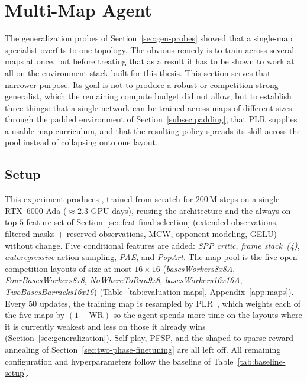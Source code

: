 \section{Multi-Map Agent}
\label{sec:multi-map}

The generalization probes of Section~\ref{sec:gen-probes} showed that a single-map specialist overfits to one topology. The obvious remedy is to train across several maps at once, but before treating that as a result it has to be shown to work at all on the environment stack built for this thesis. This section serves that narrower purpose. Its goal is not to produce a robust or competition-strong generalist, which the remaining compute budget did not allow, but to establish three things: that a single network can be trained across maps of different sizes through the padded environment of Section~\ref{subsec:padding}, that PLR supplies a usable map curriculum, and that the resulting policy spreads its skill across the pool instead of collapsing onto one layout.

\vspace{-0.15cm}

\subsection{Setup}
\label{subsec:multimap-setup}

This experiment produces , trained from scratch for $200\,\text{M}$ steps on a single RTX~6000 Ada (${\approx} 2.3$ GPU-days), reusing the  architecture and the always-on top-$5$ feature set of Section~\ref{sec:feat-final-selection} (extended observations, filtered masks $+$ reserved observations, MCW, opponent modeling, GELU) without change. Five conditional features are added: \emph{SPP critic}, \emph{frame stack~(4)}, \emph{autoregressive} action sampling, \emph{PAE}, and \emph{PopArt}. The map pool is the five open-competition layouts of size at most $16{\times}16$ (\emph{basesWorkers8x8A}, \emph{FourBasesWorkers8x8}, \emph{NoWhereToRun9x8}, \emph{basesWorkers16x16A}, \emph{TwoBasesBarracks16x16}) (Table~\ref{tab:evaluation-maps}, Appendix~\ref{app:maps}). Every $50$ updates, the training map is resampled by PLR~\cite{jiangPrioritizedLevelReplay2021}, which weights each of the five maps by $(1-\mathrm{WR})$ so the agent spends more time on the layouts where it is currently weakest and less on those it already wins (Section~\ref{sec:generalization}). Self-play, PFSP, and the shaped-to-sparse reward annealing of Section~\ref{sec:two-phase-finetuning} are all left off. All remaining configuration and hyperparameters follow the baseline of Table~\ref{tab:baseline-setup}.

